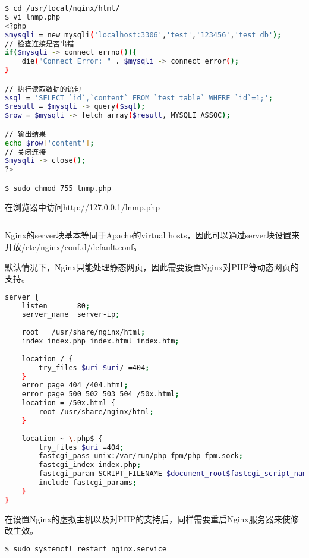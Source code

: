 \begin{lstlisting}[language=bash]
$ cd /usr/local/nginx/html/
$ vi lnmp.php
<?php
$mysqli = new mysqli('localhost:3306','test','123456','test_db');
// 检查连接是否出错
if($mysqli -> connect_errno()){
	die("Connect Error: " . $mysqli -> connect_error();
}

// 执行读取数据的语句
$sql = 'SELECT `id`,`content` FROM `test_table` WHERE `id`=1;';
$result = $mysqli -> query($sql);
$row = $mysqli -> fetch_array($result, MYSQLI_ASSOC);

// 输出结果
echo $row['content'];
// 关闭连接
$mysqli -> close();
?>

$ sudo chmod 755 lnmp.php
\end{lstlisting}

在浏览器中访问http://127.0.0.1/lnmp.php



\begin{lstlisting}[language=bash]

\end{lstlisting}

Nginx的server块基本等同于Apache的virtual hosts，因此可以通过server块设置来开放/etc/nginx/conf.d/default.conf。

默认情况下，Nginx只能处理静态网页，因此需要设置Nginx对PHP等动态网页的支持。


\begin{lstlisting}[language=bash]
server {
    listen       80;
    server_name  server-ip;
 
    root   /usr/share/nginx/html;
    index index.php index.html index.htm;
 
    location / {
        try_files $uri $uri/ =404;
    }
    error_page 404 /404.html;
    error_page 500 502 503 504 /50x.html;
    location = /50x.html {
        root /usr/share/nginx/html;
    }
 
    location ~ \.php$ {
        try_files $uri =404;
        fastcgi_pass unix:/var/run/php-fpm/php-fpm.sock;
        fastcgi_index index.php;
        fastcgi_param SCRIPT_FILENAME $document_root$fastcgi_script_name;
        include fastcgi_params;
    }
}
\end{lstlisting}

在设置Nginx的虚拟主机以及对PHP的支持后，同样需要重启Nginx服务器来使修改生效。

\begin{lstlisting}[language=bash]
$ sudo systemctl restart nginx.service
\end{lstlisting}





